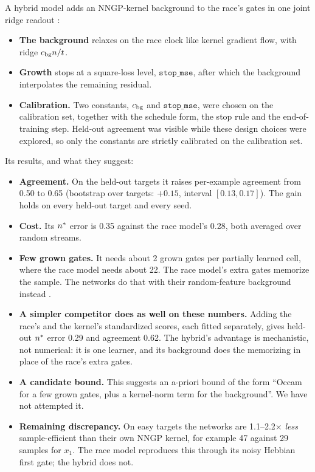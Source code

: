 A hybrid model adds an NNGP-kernel background to the race's gates in one joint ridge readout :
\begin{itemize}
\item \textbf{The background} relaxes on the race clock like kernel gradient flow, with ridge $c_{\rm bg}n/t$.
\item \textbf{Growth} stops at a square-loss level, $\texttt{stop\_mse}$, after which the background interpolates the remaining residual.
\item \textbf{Calibration.} Two constants, $c_{\rm bg}$ and $\texttt{stop\_mse}$, were chosen on the calibration set, together with the schedule form, the stop rule and the end-of-training step. Held-out agreement was visible while these design choices were explored, so only the constants are strictly calibrated on the calibration set.
\end{itemize}
Its results, and what they suggest:
\begin{itemize}
\item \textbf{Agreement.} On the held-out targets it raises per-example agreement from 0.50 to 0.65 (bootstrap over targets: $+0.15$, interval $[0.13,0.17]$). The gain holds on every held-out target and every seed.
\item \textbf{Cost.} Its $n^{*}$ error is 0.35 against the race model's 0.28, both averaged over random streams.
\item \textbf{Few grown gates.} It needs about 2 grown gates per partially learned cell, where the race model needs about 22. The race model's extra gates memorize the sample. The networks do that with their random-feature background instead .
\item \textbf{A simpler competitor does as well on these numbers.} Adding the race's and the kernel's standardized scores, each fitted separately, gives held-out $n^{*}$ error 0.29 and agreement 0.62. The hybrid's advantage is mechanistic, not numerical: it is one learner, and its background does the memorizing in place of the race's extra gates.
\item \textbf{A candidate bound.} This suggests an a-priori bound of the form ``Occam for a few grown gates, plus a kernel-norm term for the background''. We have not attempted it.
\item \textbf{Remaining discrepancy.} On easy targets the networks are 1.1–2.2$\times$ \emph{less} sample-efficient than their own NNGP kernel, for example 47 against 29 samples for $x_1$. The race model reproduces this through its noisy Hebbian first gate; the hybrid does not.
\end{itemize}
